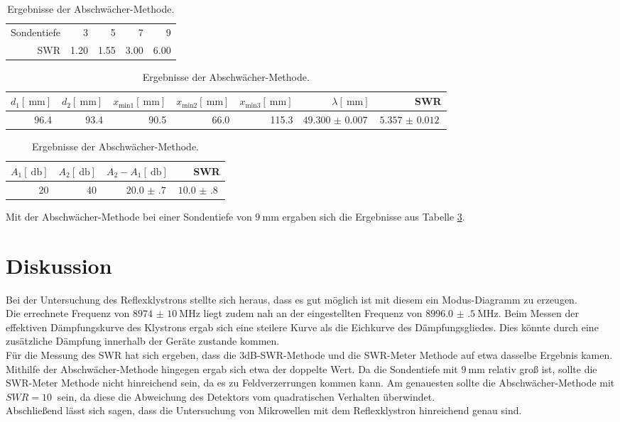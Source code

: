 \begin{table}
	\centering
	\caption{Ergebnisse der SWR-Meter Methode.}
	\begin{tabular}{r || r r r r|}
	 Sondentiefe &    3 &    5 &    7 &    9\\
	        SWR & 1.20 & 1.55 & 3.00 & 6.00\\
	\end{tabular}
\caption{Ergebnisse der 3dB-SWR-Methode.}
	\label{v3:1}
	\begin{tabular}{r r r r r r r}
	$d_\text{1}[\SI{}{\milli\meter}]$ & $d_\text{2}[\SI{}{\milli\meter}]$ & $x_\text{min1}[\SI{}{\milli\meter}]$ & $x_\text{min2}[\SI{}{\milli\meter}]$ & $x_\text{min3}[\SI{}{\milli\meter}]$ & $\lambda[\SI{}{\milli\meter}]$ & SWR\\
	\hline
	\hline
	96.4 & 93.4 & 90.5 & 66.0 & 115.3 & $\SI{49.300(7)}{}$ & $\SI{5.357(12)}{}$\\
	\end{tabular}
	\caption{Ergebnisse der Abschwächer-Methode.}
	\label{v3:2}
	\begin{tabular}{r r r r}
	$A_\text{1}[\SI{}{\decibel}]$ & $A_\text{2}[\SI{}{\decibel}]$ & $A_\text{2}-A_\text{1}[\SI{}{\decibel}]$ & SWR\\
	\hline
	\hline
	20 & 40 & $\SI{20.0(7)}{}$ & $\SI{10.0(8)}{}$\\
	\end{tabular}
	\label{v3:3}
\end{table}

Mit der Abschwächer-Methode bei einer Sondentiefe von $\SI{9}{\milli\meter}$ ergaben sich die Ergebnisse aus Tabelle \ref{v3:3}.\\


\section{Diskussion} %
\label{sec:diskussion}

Bei der Untersuchung des Reflexklystrons stellte sich heraus, dass es gut möglich ist mit diesem ein Modus-Diagramm zu erzeugen.\\

Die errechnete Frequenz von $\SI{8974(10)}{\mega\hertz}$ liegt zudem nah an der eingestellten Frequenz von $\SI{8996.0(5)}{\mega\hertz}$.
Beim Messen der effektiven Dämpfungskurve des Klystrons ergab sich eine steilere Kurve als die Eichkurve des Dämpfungsgliedes.
Dies könnte durch eine zusätzliche Dämpfung innerhalb der Geräte zustande kommen.\\

Für die Messung des SWR hat sich ergeben, dass die 3dB-SWR-Methode und die SWR-Meter Methode auf etwa dasselbe Ergebnis kamen.
Mithilfe der Abschwächer-Methode hingegen ergab sich etwa der doppelte Wert.
Da die Sondentiefe mit $\SI{9}{\milli\meter}$ relativ groß ist, sollte die SWR-Meter Methode nicht hinreichend sein, da es zu Feldverzerrungen kommen kann.
Am genauesten sollte die Abschwächer-Methode mit $SWR = \SI{10}{}$ sein, da diese die Abweichung des Detektors vom quadratischen Verhalten überwindet.\\

Abschließend lässt sich sagen, dass die Untersuchung von Mikrowellen mit dem Reflexklystron hinreichend genau sind.
